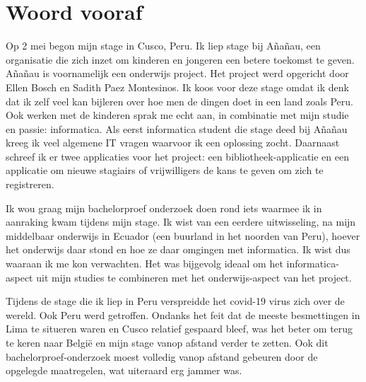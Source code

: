 
\chapter*{Woord vooraf}
\label{ch:voorwoord}


Op 2 mei begon mijn stage in Cusco, Peru. Ik liep stage bij Añañau, een organisatie die zich inzet om kinderen en jongeren een betere toekomst te geven. Añañau is voornamelijk een onderwijs project. Het project werd opgericht door Ellen Bosch en Sadith Paez Montesinos. Ik koos voor deze stage omdat ik denk dat ik zelf veel kan bijleren over hoe men de dingen doet in een land zoals Peru. Ook werken met de kinderen sprak me echt aan, in combinatie met mijn studie en passie: informatica. Als eerst informatica student die stage deed bij Añañau kreeg ik veel algemene IT vragen waarvoor ik een oplossing zocht. Daarnaast schreef ik er twee applicaties voor het project: een bibliotheek-applicatie en een applicatie om nieuwe stagiairs of vrijwilligers de kans te geven om zich te registreren. 

Ik wou graag mijn bachelorproef onderzoek doen rond iets waarmee ik in aanraking kwam tijdens mijn stage. Ik wist van een eerdere uitwisseling, na mijn middelbaar onderwijs in Ecuador (een buurland in het noorden van Peru), hoever het onderwijs daar stond en hoe ze daar omgingen met informatica. Ik wist dus waaraan ik me kon verwachten. Het was bijgevolg ideaal om het informatica-aspect uit mijn studies te combineren met het onderwijs-aspect van het project. 

Tijdens de stage die ik liep in Peru verspreidde het covid-19 virus zich over de wereld. Ook Peru werd getroffen. Ondanks het feit dat de meeste besmettingen in Lima te situeren waren en Cusco relatief gespaard bleef, was het beter om terug te keren naar België en mijn stage vanop afstand verder te zetten. Ook dit bachelorproef-onderzoek moest volledig vanop afstand gebeuren door de opgelegde maatregelen, wat uiteraard erg jammer was.

